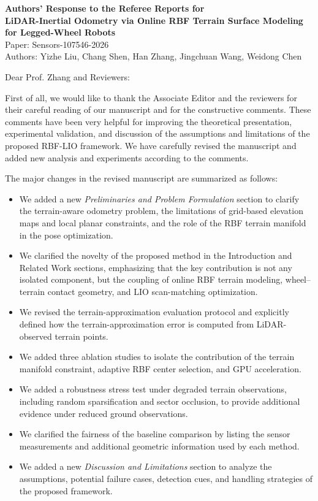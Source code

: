 \documentclass[11pt]{article}
\begin{document}
\begin{center}
{\Large\bfseries Authors' Response to the Referee Reports for}\\[0.4em]
{\large\bfseries LiDAR-Inertial Odometry via Online RBF Terrain Surface Modeling for Legged-Wheel Robots}\\[0.3em]
{\large Paper: Sensors-107546-2026}\\[0.2em]
{\large Authors: Yizhe Liu, Chang Shen, Han Zhang, Jingchuan Wang, Weidong Chen}
\end{center}

\vspace{1em}

\noindent Dear Prof. Zhang and Reviewers:

First of all, we would like to thank the Associate Editor and the reviewers for their careful reading of our manuscript and for the constructive comments. These comments have been very helpful for improving the theoretical presentation, experimental validation, and discussion of the assumptions and limitations of the proposed RBF-LIO framework. We have carefully revised the manuscript and added new analysis and experiments according to the comments.

The major changes in the revised manuscript are summarized as follows:
\begin{itemize}
    \item We added a new \textit{Preliminaries and Problem Formulation} section to clarify the terrain-aware odometry problem, the limitations of grid-based elevation maps and local planar constraints, and the role of the RBF terrain manifold in the pose optimization.
    \item We clarified the novelty of the proposed method in the Introduction and Related Work sections, emphasizing that the key contribution is not any isolated component, but the coupling of online RBF terrain modeling, wheel--terrain contact geometry, and LIO scan-matching optimization.
    \item We revised the terrain-approximation evaluation protocol and explicitly defined how the terrain-approximation error is computed from LiDAR-observed terrain points.
    \item We added three ablation studies to isolate the contribution of the terrain manifold constraint, adaptive RBF center selection, and GPU acceleration.
    \item We added a robustness stress test under degraded terrain observations, including random sparsification and sector occlusion, to provide additional evidence under reduced ground observations.
    \item We clarified the fairness of the baseline comparison by listing the sensor measurements and additional geometric information used by each method.
    \item We added a new \textit{Discussion and Limitations} section to analyze the assumptions, potential failure cases, detection cues, and handling strategies of the proposed framework.
\end{itemize}
\end{document}
